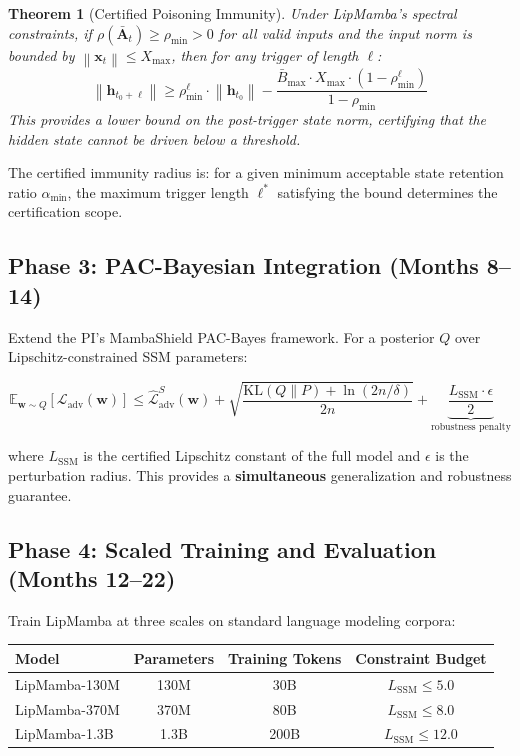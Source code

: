 \documentclass[12pt,a4paper]{article}
\newtheorem{theorem}{Theorem}
\newcommand{\E}{\mathbb{E}}
\newcommand{\calL}{\mathcal{L}}
\newcommand{\norm}[1]{\left\|#1\right\|}
\begin{document}
\begin{theorem}[Certified Poisoning Immunity]
Under LipMamba's spectral constraints, if $\rho(\bar{\mathbf{A}}_t) \geq \rho_{\min} > 0$ for all valid inputs and the input norm is bounded by $\norm{\mathbf{x}_t} \leq X_{\max}$, then for any trigger of length $\ell$:
\begin{equation}
    \norm{\mathbf{h}_{t_0+\ell}} \geq \rho_{\min}^\ell \cdot \norm{\mathbf{h}_{t_0}} - \frac{\bar{B}_{\max} \cdot X_{\max} \cdot (1 - \rho_{\min}^\ell)}{1 - \rho_{\min}}
\end{equation}
This provides a lower bound on the post-trigger state norm, certifying that the hidden state cannot be driven below a threshold.
\end{theorem}

The certified immunity radius is: for a given minimum acceptable state retention ratio $\alpha_{\min}$, the maximum trigger length $\ell^*$ satisfying the bound determines the certification scope.

\subsection{Phase 3: PAC-Bayesian Integration (Months 8--14)}

Extend the PI's MambaShield PAC-Bayes framework. For a posterior $Q$ over Lipschitz-constrained SSM parameters:

\begin{equation}
    \E_{\mathbf{w} \sim Q}\left[\calL_{\text{adv}}(\mathbf{w})\right] \leq \hat{\calL}_{\text{adv}}^S(\mathbf{w}) + \sqrt{\frac{\text{KL}(Q \| P) + \ln(2n/\delta)}{2n}} + \underbrace{\frac{L_{\text{SSM}} \cdot \epsilon}{2}}_{\text{robustness penalty}}
\end{equation}

where $L_{\text{SSM}}$ is the certified Lipschitz constant of the full model and $\epsilon$ is the perturbation radius. This provides a \textbf{simultaneous} generalization and robustness guarantee.

\subsection{Phase 4: Scaled Training and Evaluation (Months 12--22)}

Train LipMamba at three scales on standard language modeling corpora:

\begin{table}[H]
\centering
\begin{tabular}{@{}lccc@{}}
\toprule
\textbf{Model} & \textbf{Parameters} & \textbf{Training Tokens} & \textbf{Constraint Budget} \\
\midrule
LipMamba-130M & 130M & 30B & $L_{\text{SSM}} \leq 5.0$ \\
LipMamba-370M & 370M & 80B & $L_{\text{SSM}} \leq 8.0$ \\
LipMamba-1.3B & 1.3B & 200B & $L_{\text{SSM}} \leq 12.0$ \\
\bottomrule
\end{tabular}
\end{table}
\end{document}
